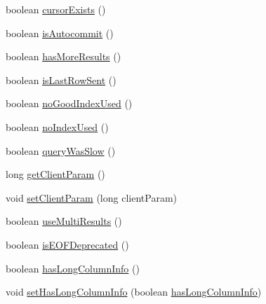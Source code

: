 \begin{DoxyCompactItemize}
boolean \mbox{\hyperlink{classcom_1_1mysql_1_1cj_1_1protocol_1_1x_1_1_x_server_session_a4631fd33459ee83b06f167ba96e9218a}{cursor\+Exists}} ()
\item 
boolean \mbox{\hyperlink{classcom_1_1mysql_1_1cj_1_1protocol_1_1x_1_1_x_server_session_ad7dc3220f3f894bcee15137e423a2d99}{is\+Autocommit}} ()
\item 
boolean \mbox{\hyperlink{classcom_1_1mysql_1_1cj_1_1protocol_1_1x_1_1_x_server_session_a2bfff32e31d81971161b232dd2288228}{has\+More\+Results}} ()
\item 
boolean \mbox{\hyperlink{classcom_1_1mysql_1_1cj_1_1protocol_1_1x_1_1_x_server_session_a1068b24a38e39b920df3a43fbf48b14c}{is\+Last\+Row\+Sent}} ()
\item 
boolean \mbox{\hyperlink{classcom_1_1mysql_1_1cj_1_1protocol_1_1x_1_1_x_server_session_afb2168187353b13226a76ba9bf659a50}{no\+Good\+Index\+Used}} ()
\item 
boolean \mbox{\hyperlink{classcom_1_1mysql_1_1cj_1_1protocol_1_1x_1_1_x_server_session_ad2c0134175f2583dba2948b4c6e79f7e}{no\+Index\+Used}} ()
\item 
boolean \mbox{\hyperlink{classcom_1_1mysql_1_1cj_1_1protocol_1_1x_1_1_x_server_session_a2789d075820b159e3b1fa98beb82bbfa}{query\+Was\+Slow}} ()
\item 
long \mbox{\hyperlink{classcom_1_1mysql_1_1cj_1_1protocol_1_1x_1_1_x_server_session_a59472f33d971d60e15b396ded510eb3a}{get\+Client\+Param}} ()
\item 
void \mbox{\hyperlink{classcom_1_1mysql_1_1cj_1_1protocol_1_1x_1_1_x_server_session_a5ec8909cbdcc47372fd091f4d7e4e786}{set\+Client\+Param}} (long client\+Param)
\item 
boolean \mbox{\hyperlink{classcom_1_1mysql_1_1cj_1_1protocol_1_1x_1_1_x_server_session_a6eee456beed92b2bd2b11e33a79c305c}{use\+Multi\+Results}} ()
\item 
boolean \mbox{\hyperlink{classcom_1_1mysql_1_1cj_1_1protocol_1_1x_1_1_x_server_session_af0ec0b234345774f557d2cf718df418e}{is\+E\+O\+F\+Deprecated}} ()
\item 
boolean \mbox{\hyperlink{classcom_1_1mysql_1_1cj_1_1protocol_1_1x_1_1_x_server_session_af4f50b365f485abca8051b96a1cdd486}{has\+Long\+Column\+Info}} ()
\item 
void \mbox{\hyperlink{classcom_1_1mysql_1_1cj_1_1protocol_1_1x_1_1_x_server_session_a3a9514d67c9914f156534c2a3e53b35a}{set\+Has\+Long\+Column\+Info}} (boolean \mbox{\hyperlink{classcom_1_1mysql_1_1cj_1_1protocol_1_1x_1_1_x_server_session_af4f50b365f485abca8051b96a1cdd486}{has\+Long\+Column\+Info}})

\end{DoxyCompactItemize}
